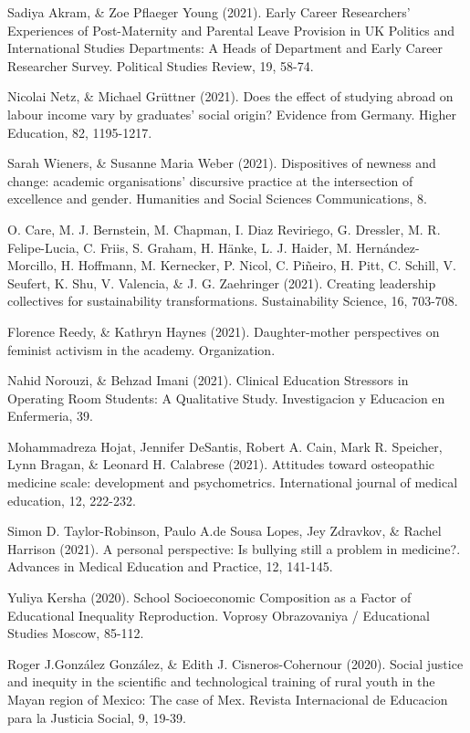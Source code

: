 \documentclass[runningheads]{llncs}
\begin{document}
\begin{multicols}{2}
Sadiya Akram, \& Zoe Pflaeger Young (2021). Early Career Researchers’ Experiences of Post-Maternity and Parental Leave Provision in UK Politics and International Studies Departments: A Heads of Department and Early Career Researcher Survey. Political Studies Review, 19, 58-74.

Nicolai Netz, \& Michael Grüttner (2021). Does the effect of studying abroad on labour income vary by graduates’ social origin? Evidence from Germany. Higher Education, 82, 1195-1217.

Sarah Wieners, \& Susanne Maria Weber (2021). Dispositives of newness and change: academic organisations’ discursive practice at the intersection of excellence and gender. Humanities and Social Sciences Communications, 8.

O. Care, M. J. Bernstein, M. Chapman, I. Diaz Reviriego, G. Dressler, M. R. Felipe-Lucia, C. Friis, S. Graham, H. Hänke, L. J. Haider, M. Hernández-Morcillo, H. Hoffmann, M. Kernecker, P. Nicol, C. Piñeiro, H. Pitt, C. Schill, V. Seufert, K. Shu, V. Valencia, \& J. G. Zaehringer (2021). Creating leadership collectives for sustainability transformations. Sustainability Science, 16, 703-708.

Florence Reedy, \& Kathryn Haynes (2021). Daughter-mother perspectives on feminist activism in the academy. Organization.

Nahid Norouzi, \& Behzad Imani (2021). Clinical Education Stressors in Operating Room Students: A Qualitative Study. Investigacion y Educacion en Enfermeria, 39.

Mohammadreza Hojat, Jennifer DeSantis, Robert A. Cain, Mark R. Speicher, Lynn Bragan, \& Leonard H. Calabrese (2021). Attitudes toward osteopathic medicine scale: development and psychometrics. International journal of medical education, 12, 222-232.

Simon D. Taylor-Robinson, Paulo A.de Sousa Lopes, Jey Zdravkov, \& Rachel Harrison (2021). A personal perspective: Is bullying still a problem in medicine?. Advances in Medical Education and Practice, 12, 141-145.

Yuliya Kersha (2020). School Socioeconomic Composition as a Factor of Educational Inequality Reproduction. Voprosy Obrazovaniya / Educational Studies Moscow, 85-112.

Roger J.González González, \& Edith J. Cisneros-Cohernour (2020). Social justice and inequity in the scientific and technological training of rural youth in the Mayan region of Mexico: The case of Mex. Revista Internacional de Educacion para la Justicia Social, 9, 19-39.


\end{multicols}
\end{document}
